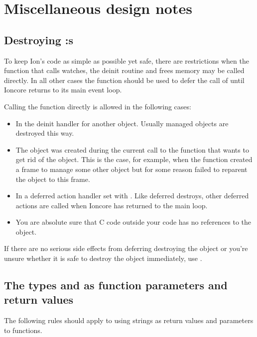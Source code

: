 \section{Miscellaneous design notes}

\subsection{Destroying :s}

To keep Ion's code as simple as possible yet safe, there are restrictions
when the 
function that calls watches, the deinit routine and frees memory may
be called directly. In all other cases the 
function should be used to defer the call of  until
Ioncore returns to its main event loop. 

Calling the  function directly is allowed in the
following cases:
\begin{itemize}
    \item In the deinit handler for another object. Usually managed objects
      are destroyed this way.
    \item The object was created during the current call to the function
      that wants to get rid of the object. This is the case, for example,
      when the function created a frame to manage some other object but for
      some reason failed to reparent the object to this frame.
    \item In a deferred action handler set with
      .
      Like deferred destroys, other deferred actions are called when
      Ioncore has returned to the main loop.
    \item You are absolute sure that C code outside your code has no
      references to the object.
\end{itemize}

If there are no serious side effects from deferring destroying the
object or you're unsure whether it is safe to destroy the object
immediately, use .

\subsection{The types  and  as function
  parameters and return values}

The following rules should apply to using strings as return values and
parameters to functions. 

